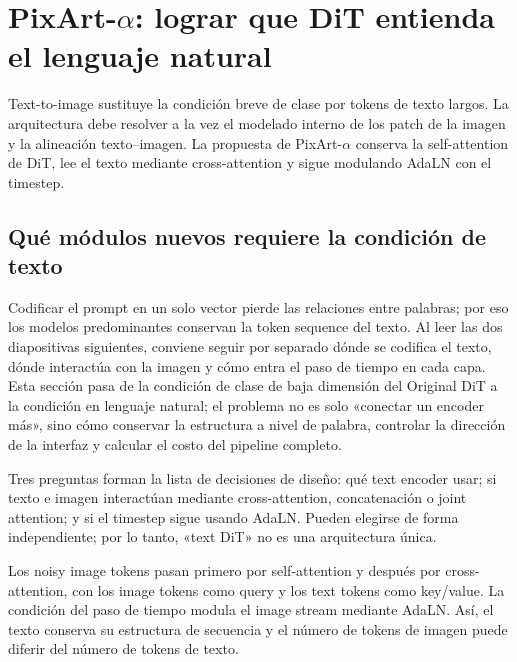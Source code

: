 \section{PixArt-$\alpha$: lograr que DiT entienda el lenguaje natural}

Text-to-image sustituye la condición breve de clase por tokens de texto largos. La arquitectura debe resolver a la vez el modelado interno de los patch de la imagen y la alineación texto--imagen. La propuesta de PixArt-$\alpha$ conserva la self-attention de DiT, lee el texto mediante cross-attention y sigue modulando AdaLN con el timestep.

\subsection{Qué módulos nuevos requiere la condición de texto}

Codificar el prompt en un solo vector pierde las relaciones entre palabras; por eso los modelos predominantes conservan la token sequence del texto. Al leer las dos diapositivas siguientes, conviene seguir por separado dónde se codifica el texto, dónde interactúa con la imagen y cómo entra el paso de tiempo en cada capa. Esta sección pasa de la condición de clase de baja dimensión del Original DiT a la condición en lenguaje natural; el problema no es solo «conectar un encoder más», sino cómo conservar la estructura a nivel de palabra, controlar la dirección de la interfaz y calcular el costo del pipeline completo.


Tres preguntas forman la lista de decisiones de diseño: qué text encoder usar; si texto e imagen interactúan mediante cross-attention, concatenación o joint attention; y si el timestep sigue usando AdaLN. Pueden elegirse de forma independiente; por lo tanto, «text DiT» no es una arquitectura única.


Los noisy image tokens pasan primero por self-attention y después por cross-attention, con los image tokens como query y los text tokens como key/value. La condición del paso de tiempo modula el image stream mediante AdaLN. Así, el texto conserva su estructura de secuencia y el número de tokens de imagen puede diferir del número de tokens de texto.

